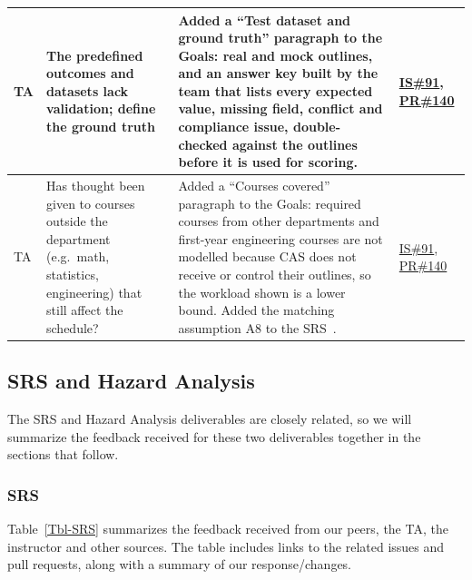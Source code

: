 \documentclass{article}
\begin{document}
\begin{longtable}{|p{2cm}|p{4cm}|p{5cm}|p{4cm}|}
\hline
TA & The predefined outcomes and datasets lack validation; define the ground
truth & Added a ``Test dataset and ground truth'' paragraph to the Goals: real
and mock outlines, and an answer key built by the team that lists every expected
value, missing field, conflict and compliance issue, double-checked against the
outlines before it is used for scoring. &
\href{https://github.com/shivyam/cas-course-optimization/issues/91}{IS\#91}, \href{https://github.com/shivyam/cas-course-optimization/pull/140}{PR\#140} \\
\hline
TA & Has thought been given to courses outside the department (e.g.\ math,
statistics, engineering) that still affect the schedule? & Added a ``Courses
covered'' paragraph to the Goals: required courses from other departments and
first-year engineering courses are not modelled because CAS does not receive or
control their outlines, so the workload shown is a lower bound. Added the
matching assumption A8 to the SRS~\citep{TeamBVSH2026SRS}. &
\href{https://github.com/shivyam/cas-course-optimization/issues/91}{IS\#91}, \href{https://github.com/shivyam/cas-course-optimization/pull/140}{PR\#140} \\
\hline
\end{longtable}

\subsection{SRS and Hazard Analysis}

The SRS and Hazard Analysis deliverables are closely related, so we will
summarize the feedback received for these two deliverables together in the
sections that follow.

\subsubsection{SRS}

Table~\ref{Tbl-SRS} summarizes the feedback received from our peers, the TA, the
instructor and other sources.  The table includes links to the related issues
and pull requests, along with a summary of our response/changes.
\end{document}

